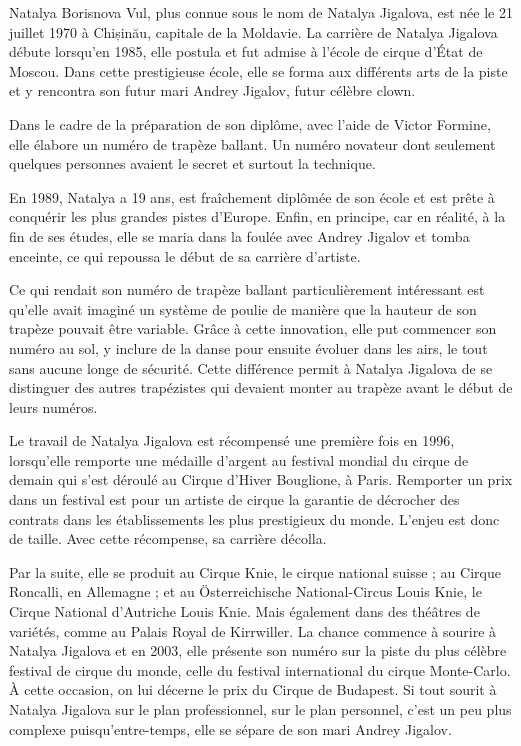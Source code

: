 Natalya Borisnova Vul, plus connue sous le nom de Natalya Jigalova, est née le 21 juillet 1970 à Chișinău, capitale de la Moldavie. La carrière de Natalya Jigalova débute lorsqu’en 1985, elle postula et fut admise à l'école de cirque d'État de Moscou. Dans cette prestigieuse école, elle se forma aux différents arts de la piste et y rencontra son futur mari Andrey Jigalov, futur célèbre clown. 

Dans le cadre de la préparation de son diplôme, avec l’aide de Victor Formine, elle élabore un numéro de trapèze ballant. Un numéro novateur dont seulement quelques personnes avaient le secret et surtout la technique.

En 1989, Natalya a 19 ans, est fraîchement diplômée de son école et est prête à conquérir les plus grandes pistes d’Europe. Enfin, en principe, car en réalité, à la fin de ses études, elle se maria dans la foulée avec Andrey Jigalov et tomba enceinte, ce qui repoussa le début de sa carrière d'artiste. 

Ce qui rendait son numéro de trapèze ballant particulièrement intéressant est qu'elle avait imaginé un système de poulie de manière que la hauteur de son trapèze pouvait être variable. Grâce à cette innovation, elle put commencer son numéro au sol, y inclure de la danse pour ensuite évoluer dans les airs, le tout sans aucune longe de sécurité. Cette différence permit à Natalya Jigalova de se distinguer des autres trapézistes qui devaient monter au trapèze avant le début de leurs numéros.

Le travail de Natalya Jigalova est récompensé une première fois en 1996, lorsqu’elle remporte une médaille d'argent au festival mondial du cirque de demain qui s’est déroulé au Cirque d'Hiver Bouglione, à Paris. Remporter un prix dans un festival est pour un artiste de cirque la garantie de décrocher des contrats dans les établissements les plus prestigieux du monde. L'enjeu est donc de taille. Avec cette récompense, sa carrière décolla.

Par la suite, elle se produit au Cirque Knie, le cirque national suisse ; au Cirque Roncalli, en Allemagne ; et au Österreichische National-Circus Louis Knie, le Cirque National d’Autriche Louis Knie. Mais également dans des théâtres de variétés, comme au Palais Royal de Kirrwiller. La chance commence à sourire à Natalya Jigalova et en 2003, elle présente son numéro sur la piste du plus célèbre festival de cirque du monde, celle du festival international du cirque Monte-Carlo. À cette occasion, on lui décerne le prix du Cirque de Budapest. Si tout sourit à Natalya Jigalova sur le plan professionnel, sur le plan personnel, c'est un peu plus complexe puisqu’entre-temps, elle se sépare de son mari Andrey Jigalov.

